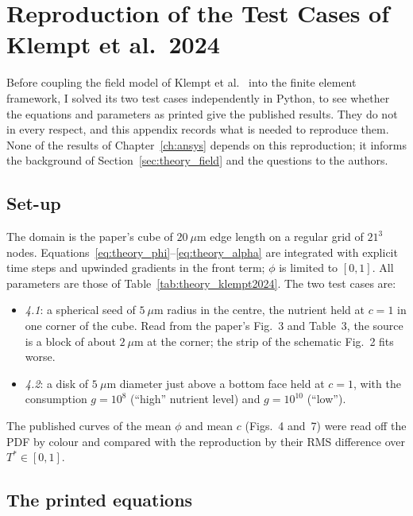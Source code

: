 \chapter{Reproduction of the Test Cases of Klempt et al.\ 2024}
\label{app:klempt2024}


Before coupling the field model of Klempt et al.~\cite{Klempt2024DiffusionDrivenGrowth}
into the finite element framework, I solved its two test cases independently
in Python, to see whether the equations and parameters as printed give the
published results. They do not in every respect, and this appendix records
what is needed to reproduce them. None of the results of
Chapter~\ref{ch:ansys} depends on this reproduction; it informs the
background of Section~\ref{sec:theory_field} and the questions to the authors.

\section{Set-up}

The domain is the paper's cube of $20~\mu$m edge length on a regular grid of
$21^3$ nodes. Equations~\eqref{eq:theory_phi}--\eqref{eq:theory_alpha} are
integrated with explicit time steps and upwinded gradients in the front term;
$\phi$ is limited to $[0,1]$. All parameters are those of
Table~\ref{tab:theory_klempt2024}. The two test cases are:
\begin{itemize}
  \item \emph{4.1}: a spherical seed of $5~\mu$m radius in the centre, the nutrient held at
        $c=1$ in one corner of the cube. Read from the paper's Fig.~3 and
        Table~3, the source is a block of about $2~\mu$m at the corner; the
        strip of the schematic Fig.~2 fits worse.
  \item \emph{4.2}: a disk of $5~\mu$m diameter just above a bottom face
        held at $c=1$, with the consumption $g=10^8$ (``high'' nutrient level)
        and $g=10^{10}$ (``low'').
\end{itemize}
The published curves of the mean $\phi$ and mean $c$ (Figs.~4 and~7) were
read off the PDF by colour and compared with the reproduction by their RMS
difference over $T^*\in[0,1]$.

\section{The printed equations}

